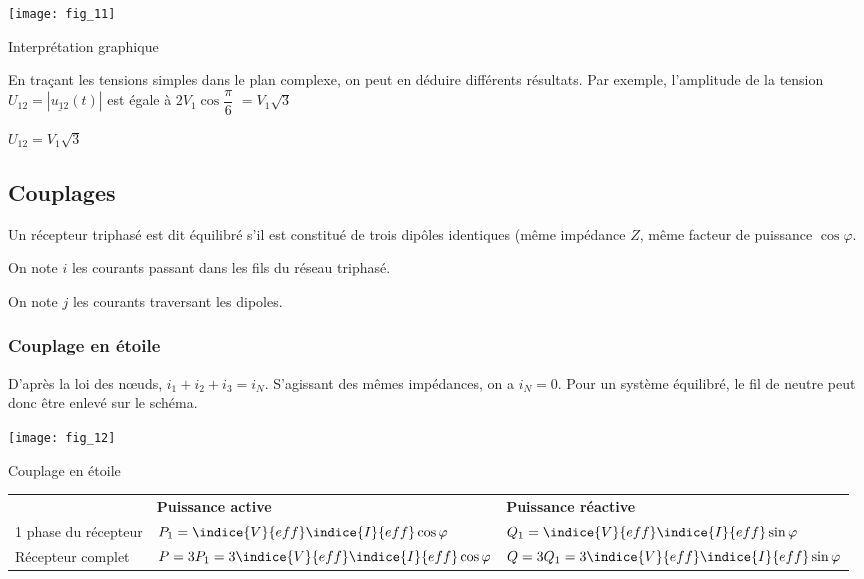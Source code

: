 \begin{marginfigure}
\centering
\texttt{[image: fig\_11]}
\caption{Interprétation graphique \label{fig:ge:cours:11}}
\end{marginfigure}

En traçant les tensions simples dans le plan complexe, on peut en déduire différents résultats. 
Par exemple, l'amplitude de la tension $U_{12}=|\underline{u_{12}}(t)|$ est égale à $2V_1\cos \dfrac{\pi}{6}$ 
$ = {V}_{1}\sqrt{3}$ 

\begin{resultat}
$U_{12} = {V}_{1}\sqrt{3}$
\end{resultat}


\subsection{Couplages}
\begin{defi}
Un récepteur triphasé est dit équilibré s'il est constitué de trois dipôles identiques (même impédance $Z$, même facteur de puissance $\cos\varphi$.

On note $i$ les courants passant dans les fils du réseau triphasé.

On note $j$ les courants traversant les dipoles.
\end{defi}

\subsubsection{Couplage en étoile}

D'après la loi des n\oe{}uds, $i_1 + i_2 + i_3 = i_N$. S'agissant des mêmes impédances, on a $i_N=0$. Pour un système équilibré, le fil de neutre peut donc être enlevé sur le schéma.


\begin{marginfigure}
\centering
\texttt{[image: fig\_12]}
\caption{Couplage en étoile \label{fig:ge:cours:12}}
\end{marginfigure}


\begin{tabular}{lll}
\hline
& \textbf{Puissance active} & \textbf{Puissance réactive} \\ 
1 phase du récepteur & 
$P_1 = \indice{V}{eff}\indice{I}{eff} \cos \varphi$ &
$Q_1 = \indice{V}{eff}\indice{I}{eff} \sin \varphi$ \\
Récepteur complet & 
$P = 3P_1 =  3\indice{V}{eff}\indice{I}{eff} \cos \varphi$ &
$Q = 3Q_1 = 3 \indice{V}{eff}\indice{I}{eff} \sin \varphi$ \\
\hline
\end{tabular}

